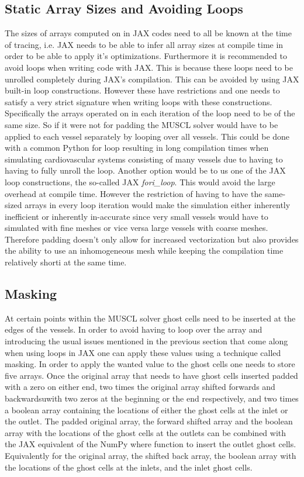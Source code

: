 \documentclass[a4paper, oneside]{discothesis}
\begin{document}
							\subsection{Static Array Sizes and Avoiding Loops} \label{sec:al}
							The sizes of arrays computed on in JAX codes need to all be known at the time of tracing, i.e. JAX needs to be able to infer all array sizes at compile time in order to be able to apply it's optimizations.
							Furthermore it is recommended to avoid loops when writing code with JAX.
							This is because these loops need to be unrolled completely during JAX's compilation.
							This can be avoided by using JAX built-in loop constructions.
							However these have restrictions and one needs to satisfy a very strict signature when writing loops with these constructions.
							Specifically the arrays operated on in each iteration of the loop need to be of the same size.
							So if it were not for padding the MUSCL solver would have to be applied to each vessel separately by looping over all vessels.
							This could be done with a common Python for loop resulting in long compilation times when simulating cardiovascular systems consisting of many vessels due to having to having to fully unroll the loop.
							Another option would be to us one of the JAX loop constructions, the so-called JAX \emph{fori\_loop}.
							This would avoid the large overhead at compile time.
							However the restriction of having to have the same-sized arrays in every loop iteration would make the simulation either inherently inefficient or inherently in-accurate since very small vessels would have to simulated with fine meshes or vice versa large vessels with coarse meshes.
							Therefore padding doesn't only allow for increased vectorization but also provides the ability to use an inhomogeneous mesh while keeping the compilation time relatively shorti at the same time.

							\subsection{Masking} \label{sec:msk}
							At certain points within the MUSCL solver ghost cells need to be inserted at the edges of the vessels.
							In order to avoid having to loop over the array and introducing the usual issues mentioned in the previous section that come along when using loops in JAX one can apply these values using a technique called masking.
							In order to apply the wanted value to the ghost cells one needs to store five arrays.
							Once the original array that needs to have ghost cells inserted padded with a zero on either end, two times the original array shifted forwards and backwardsuwith two zeros at the beginning or the end respectively, and two times a boolean array containing the locations of either the ghost cells at the inlet or the outlet.
							The padded original array, the forward shifted array and the boolean array with the locations of the ghost cells at the outlets can be combined with the JAX equivalent of the NumPy where function to insert the outlet ghost cells.
							Equivalently for the original array, the shifted back array, the boolean array with the locations of the ghost cells at the inlets, and the inlet ghost cells.
\end{document}
